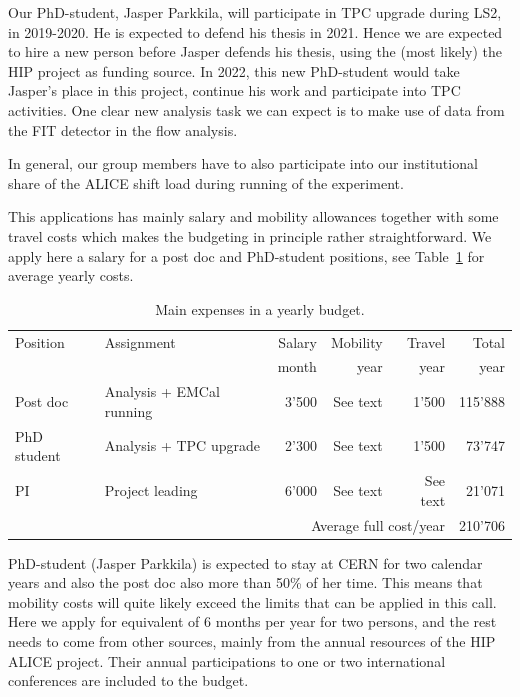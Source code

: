 Our PhD-student, Jasper Parkkila, will participate in TPC upgrade during LS2, in 2019-2020. He is expected to defend his thesis in 2021. Hence we are expected to hire a new person before Jasper defends his thesis, using the (most likely) the HIP project as funding source. In 2022, this new PhD-student would take Jasper's place in this project, continue his work and participate into TPC activities. One clear new analysis task we can expect is to make use of data from the FIT detector in the flow analysis.

In general, our group members have to also participate into our institutional share of the ALICE shift load during running of the experiment.

This applications has mainly salary and mobility allowances together with some travel costs which makes the budgeting in principle rather straightforward. We apply here a salary for a post doc and PhD-student positions, see Table~\ref{tab:money} for average yearly costs.
\begin{table}[htp]
\caption{Main expenses in a yearly budget.}
\begin{center}
\begin{tabular}{|l|l|r|r|r|r|}
\hline
Position & Assignment & Salary & Mobility & Travel & Total\\
& & month & year & year & year \\\hline
Post doc & Analysis + EMCal running    & 3'500 & See text & 1'500 & 115'888 \\
PhD student & Analysis + TPC upgrade & 2'300 &  See text   & 1'500 & 73'747 \\
PI & Project leading & 6'000 &  See text   & See text  & 21'071 \\
\hline
\multicolumn{5}{|r|}{Average full cost/year} & 210'706  \\
\hline
\end{tabular}
\end{center}
\label{tab:money}
\end{table}
PhD-student (Jasper Parkkila) is expected to stay at CERN for two calendar years and also the post doc also more than 50\% of her time. This means that mobility costs will quite likely exceed the limits that can be applied in this call. Here we apply for equivalent of 6 months per year for two persons, and the rest needs to come from other sources, mainly from the annual resources of the HIP ALICE project. Their annual participations to one or two international conferences are included to the budget.

